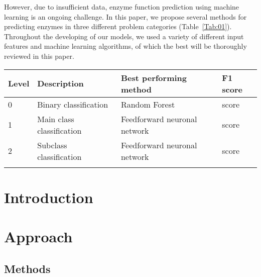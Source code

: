 \documentclass{bioinfo}
\begin{document}
However, due to insufficient data, enzyme function prediction using machine learning is an ongoing challenge.
In this paper, we propose several methods for predicting enzymes in three different problem categories (Table~\ref{Tab:01}).
Throughout the developing of our models, we used a variety of different input features and machine learning algorithms, of which the best will be thoroughly reviewed in this paper.
\begin{center}
\begin{table}[!htbp]
 {\begin{tabular}{@{}llll@{}}\toprule 
		Level & Description & Best performing method & F1 score\\\midrule
		0 & Binary classification & Random Forest & score\\
		1 & Main class classification & Feedforward neuronal network & score \\
		2 & Subclass classification & Feedforward neuronal network & score \\\botrule
\end{tabular}}{}
\end{table}
\end{center}




\section{Introduction}

\lipsum[1]

\section{Approach}
\lipsum[1]

\begin{methods}
\section{Methods}
\lipsum[1]



\end{methods}


\end{document}
